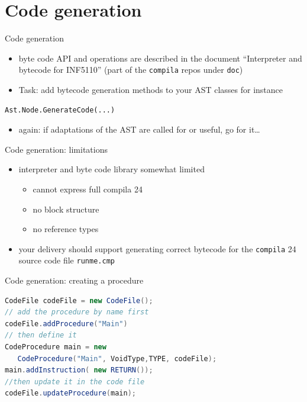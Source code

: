 \documentclass{beamer}
\begin{document}
\section{Code generation}
\label{sec:org15a5bd6}
\begin{frame}[label={sec:org49ea5c0},fragile]{Code generation}
 \begin{itemize}
\item byte code API and operations are described in the document ``Interpreter
and bytecode for INF5110'' (part of the \texttt{compila} repos under \texttt{doc})

\item \alert{Task:} add bytecode generation methods to your AST classes
for instance
\end{itemize}

\begin{verbatim}
Ast.Node.GenerateCode(...)
\end{verbatim}
\begin{itemize}
\item again: if adaptations of the AST are called for or useful, go for it\ldots{}
\end{itemize}
\end{frame}
\begin{frame}[label={sec:org778d95f},fragile]{Code generation: limitations}
 \begin{itemize}
\item interpreter and byte code library somewhat \alert{limited}
\begin{itemize}
\item cannot express full compila 24
\item no block structure
\item no reference types
\end{itemize}
\end{itemize}


\begin{itemize}
\item your delivery should support generating correct bytecode
for the \texttt{compila} 24 source code file \texttt{runme.cmp}
\end{itemize}
\end{frame}
\begin{frame}[label={sec:org5174717},fragile,plain]{Code generation: creating a procedure}
 \begin{lstlisting}[language=java,numbers=none]
CodeFile codeFile = new CodeFile();
// add the procedure by name first
codeFile.addProcedure("Main")
// then define it
CodeProcedure main = new 
   CodeProcedure("Main", VoidType,TYPE, codeFile);
main.addInstruction( new RETURN());
//then update it in the code file
codeFile.updateProcedure(main);
\end{lstlisting}
\end{frame}
\end{document}
